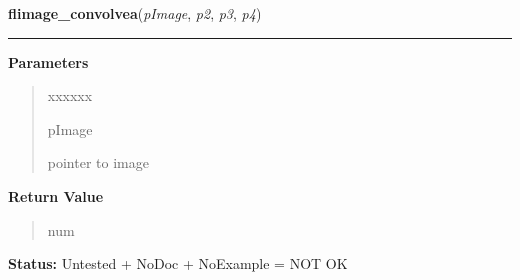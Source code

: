 \hspace{.8\funcindent}\begin{boxedminipage}{\funcwidth}

    \raggedright \textbf{flimage\_convolvea}(\textit{pImage}, \textit{p2}, \textit{p3}, \textit{p4})

    \vspace{-1.5ex}

    \rule{\textwidth}{0.5\fboxrule}
\setlength{\parskip}{2ex}
\setlength{\parskip}{1ex}
      \textbf{Parameters}
      \vspace{-1ex}

      \begin{quote}
        \begin{Ventry}{xxxxxx}

          \item[pImage]

          pointer to image

        \end{Ventry}

      \end{quote}

      \textbf{Return Value}
    \vspace{-1ex}

      \begin{quote}
      num

      \end{quote}

\textbf{Status:} Untested + NoDoc + NoExample = NOT OK



    \end{boxedminipage}

    \label{xformslib:library:flimage_tint}

    \vspace{0.5ex}

